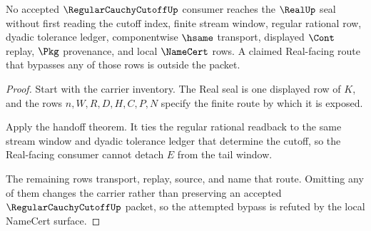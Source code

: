 \begin{theorem}
\label{thm:regular-cauchy-cutoff-nonescape}
No accepted $\RegularCauchyCutoffUp$ consumer reaches the $\RealUp$ seal without first reading the cutoff index, finite stream window, regular rational row, dyadic tolerance ledger, componentwise $\hsame$ transport, displayed $\Cont$ replay, $\Pkg$ provenance, and local $\NameCert$ rows. A claimed Real-facing route that bypasses any of those rows is outside the packet.
\end{theorem}
\begin{proof}
Start with the carrier inventory. The Real seal is one displayed row of $K$, and the rows $n,W,R,D,H,C,P,N$ specify the finite route by which it is exposed.

Apply the handoff theorem. It ties the regular rational readback to the same stream window and dyadic tolerance ledger that determine the cutoff, so the Real-facing consumer cannot detach $E$ from the tail window.

The remaining rows transport, replay, source, and name that route. Omitting any of them changes the carrier rather than preserving an accepted $\RegularCauchyCutoffUp$ packet, so the attempted bypass is refuted by the local NameCert surface.
\end{proof}




